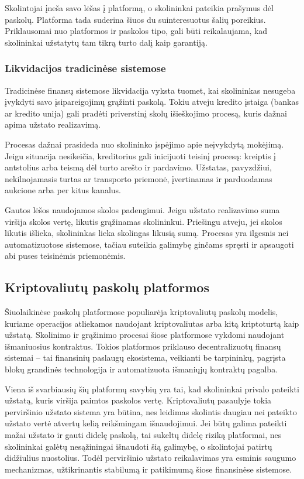 \documentclass[]{VUMIFTemplateClass}
\begin{document}
Skolintojai įneša savo lėšas į platformą, o skolininkai pateikia prašymus dėl paskolų. Platforma tada suderina šiuos du suinteresuotus šalių poreikius. Priklausomai nuo platformos ir paskolos tipo, gali būti reikalaujama, kad skolininkai užstatytų tam tikrą turto dalį kaip garantiją.

\subsubsection{Likvidacijos tradicinėse sistemose}
Tradicinėse finansų sistemose likvidacija vyksta tuomet, kai skolininkas nesugeba įvykdyti savo įsipareigojimų grąžinti paskolą. Tokiu atveju kredito įstaiga (bankas ar kredito unija) gali pradėti priverstinį skolų išieškojimo procesą, kuris dažnai apima užstato realizavimą.

Procesas dažnai prasideda nuo skolininko įspėjimo apie neįvykdytą mokėjimą. Jeigu situacija nesikeičia, kreditorius gali inicijuoti teisinį procesą: kreiptis į antstolius arba teismą dėl turto arešto ir pardavimo. Užstatas, pavyzdžiui, nekilnojamasis turtas ar transporto priemonė, įvertinamas ir parduodamas aukcione arba per kitus kanalus.

Gautos lėšos naudojamos skolos padengimui. Jeigu užstato realizavimo suma viršija skolos vertę, likutis grąžinamas skolininkui. Priešingu atveju, jei skolos likutis išlieka, skolininkas lieka skolingas likusią sumą. Procesas yra ilgesnis nei automatizuotose sistemose, tačiau suteikia galimybę ginčams spręsti ir apsaugoti abi puses teisinėmis priemonėmis.

\subsection{Kriptovaliutų paskolų platformos}
Šiuolaikinėse paskolų platformose populiarėja kriptovaliutų paskolų modelis, kuriame operacijos atliekamos naudojant kriptovaliutas arba kitą kriptoturtą kaip užstatą. Skolinimo ir grąžinimo procesai šiose platformose vykdomi naudojant išmaniuosius kontraktus. Tokios platformos priklauso decentralizuotų finansų sistemai – tai finansinių paslaugų ekosistema, veikianti be tarpininkų, pagrįsta blokų grandinės technologija ir automatizuota išmaniųjų kontraktų pagalba.

Viena iš svarbiausių šių platformų savybių yra tai, kad skolininkai privalo pateikti užstatą, kuris viršija paimtos paskolos vertę. Kriptovaliutų pasaulyje tokia perviršinio užstato sistema yra būtina, nes leidimas skolintis daugiau nei pateikto užstato vertė atvertų kelią reikšmingam išnaudojimui. Jei būtų galima pateikti mažai užstato ir gauti didelę paskolą, tai sukeltų didelę riziką platformai, nes skolininkai galėtų nesąžiningai išnaudoti šią galimybę, o skolintojai patirtų didžiulius nuostolius. Todėl perviršinio užstato reikalavimas yra esminis saugumo mechanizmas, užtikrinantis stabilumą ir patikimumą šiose finansinėse sistemose. \cite{whatisdefiliquidation}
\end{document}
